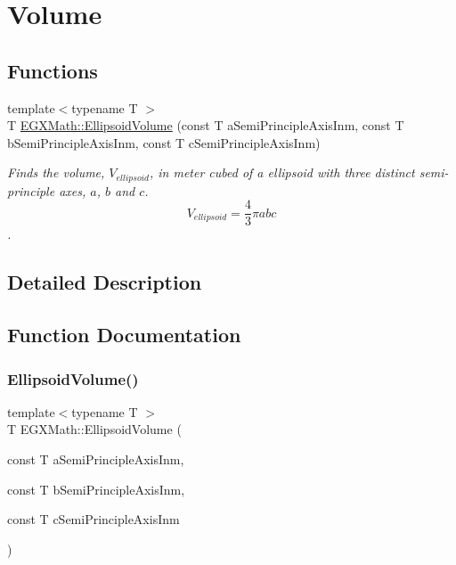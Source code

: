 \hypertarget{group___e_g_x_math-_geometry-3_d-_ellipsoid-_volume}{}\section{Volume}
\label{group___e_g_x_math-_geometry-3_d-_ellipsoid-_volume}
\subsection*{Functions}
\begin{DoxyCompactItemize}
\item 
{\footnotesize template$<$typename T $>$ }\\T \mbox{\hyperlink{group___e_g_x_math-_geometry-3_d-_ellipsoid-_volume_ga82d69f6cd6f1d4f890d875090924265d}{E\+G\+X\+Math\+::\+Ellipsoid\+Volume}} (const T a\+Semi\+Principle\+Axis\+Inm, const T b\+Semi\+Principle\+Axis\+Inm, const T c\+Semi\+Principle\+Axis\+Inm)
\begin{DoxyCompactList}\small\item\em Finds the volume, $V_{ellipsoid}$, in meter cubed of a ellipsoid with three distinct semi-\/principle axes, $a$, $b$ and $c$. \[ V_{ellipsoid}=\frac{4}{3}\pi a b c \]. \end{DoxyCompactList}\end{DoxyCompactItemize}


\subsection{Detailed Description}


\subsection{Function Documentation}
\mbox{\label{group___e_g_x_math-_geometry-3_d-_ellipsoid-_volume_ga82d69f6cd6f1d4f890d875090924265d}} 
\subsubsection{\texorpdfstring{Ellipsoid\+Volume()}{EllipsoidVolume()}}
{\footnotesize\ttfamily template$<$typename T $>$ \\
T E\+G\+X\+Math\+::\+Ellipsoid\+Volume (\begin{DoxyParamCaption}\item[{const T}]{a\+Semi\+Principle\+Axis\+Inm,  }\item[{const T}]{b\+Semi\+Principle\+Axis\+Inm,  }\item[{const T}]{c\+Semi\+Principle\+Axis\+Inm }\end{DoxyParamCaption})}



